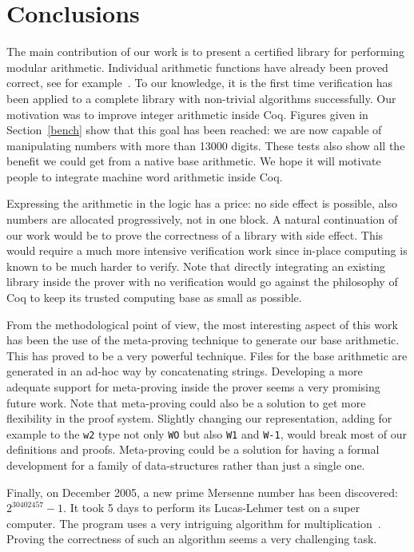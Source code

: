\section{Conclusions}


The main contribution of our work is to present a certified library for performing
modular arithmetic. Individual arithmetic functions have already been proved correct,
see for example~\cite{BerMagZim02}. To our knowledge, it is the first time verification
has been applied to a complete library  with non-trivial algorithms successfully.
Our motivation was to improve integer arithmetic inside {\sc Coq}. Figures given in Section~\ref{bench} 
show that this goal has been reached: we are now capable of manipulating numbers with more than 13000 digits.
These tests also show all the benefit we could get from a native base arithmetic. We hope it will motivate people 
to integrate machine word arithmetic inside {\sc Coq}.

Expressing the arithmetic in the logic has a price: no side effect is possible, 
also numbers are allocated progressively, not in one block.
A natural continuation of our work would be to prove the correctness of a library with side effect.
This would require a much more intensive verification work since in-place computing
is known to be much harder to verify.
Note that directly integrating an existing library inside the prover with no verification
would go against the philosophy of {\sc Coq} to keep its trusted computing base as small
as possible.

From the methodological point of view, the most interesting aspect of this work
has been the use of the meta-proving technique to generate our base arithmetic. This has proved
to be a very powerful technique. Files for the base arithmetic are generated in an ad-hoc way
by concatenating strings. Developing a more adequate support for meta-proving inside the prover seems a
very promising future work. Note that meta-proving could also be a solution to get more flexibility
in the proof system. Slightly changing our representation, adding for example to  the {\tt w2} type not only {\tt WO}
but also {\tt W1} and {\tt W-1}, would break most of our definitions and proofs.
Meta-proving could be a solution for having a formal development for a family of data-structures rather than
just a single one.

Finally, on December 2005, a new prime Mersenne number has been discovered: $2 ^{30402457} - 1$.
It took 5 days to  perform its Lucas-Lehmer test on a super computer. 
The program uses a very intriguing algorithm for 
multiplication~\cite{crandall}. 
Proving the correctness of
such an algorithm seems a very challenging task. 
